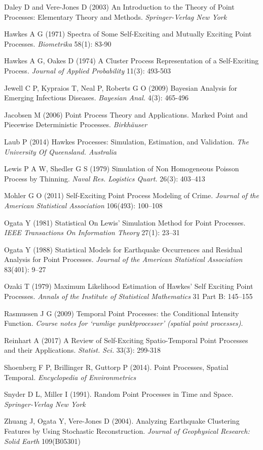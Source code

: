 \documentclass[11pt,a4paper]{article}
\begin{document}
\begin{thebibliography}{99}

 Daley D and Vere-Jones D (2003) An Introduction to the Theory of Point Processes: Elementary Theory and Methods. \textit{Springer-Verlag New York}

 Hawkes A G (1971) Spectra of Some Self-Exciting and Mutually Exciting Point Processes. \textit{Biometrika} 58(1): 83-90

 Hawkes A G, Oakes D (1974) A Cluster Process Representation of a Self-Exciting Process. \textit{Journal of Applied Probability} 11(3): 493-503

 Jewell C P, Kypraios T, Neal P, Roberts G O (2009) Bayesian Analysis for Emerging Infectious Diseases. \textit{Bayesian Anal.} 4(3): 465-496

 Jacobsen M (2006) Point Process Theory and Applications. Marked Point and Piecewise Deterministic Processes. \textit{Birkh\"{a}user}

 Laub P (2014) Hawkes Processes: Simulation, Estimation, and Validation. \textit{The University Of Queensland. Australia}

 Lewis P A W, Shedler G S (1979) Simulation of Non Homogeneous Poisson Process by Thinning. \textit{Naval Res. Logistics Quart.} 26(3): 403–413

 Mohler G O (2011) Self-Exciting Point Process Modeling of Crime. \textit{Journal of the American Statistical Association} 106(493): 100–108

 Ogata Y (1981) Statistical On Lewis' Simulation Method for Point Processes. \textit{IEEE Transactions On Information Theory} 27(1): 23–31

 Ogata Y (1988) Statistical Models for Earthquake Occurrences and Residual Analysis for Point Processes. \textit{Journal of the American Statistical Association} 83(401): 9–27

 Ozaki T (1979) Maximum Likelihood Estimation of Hawkes' Self Exciting Point Processes. \textit{Annals of the Institute of Statistical Mathematics} 31 Part B: 145–155

 Rasmussen J G (2009) Temporal Point Processes: the Conditional Intensity Function. \textit{Course notes for ‘rumlige punktprocesser’ (spatial point processes)}.

 Reinhart A (2017) A Review of Self-Exciting Spatio-Temporal Point Processes and their Applications. \textit{Statist. Sci.} 33(3): 299-318

 Shoenberg F P, Brillinger R, Guttorp P (2014). Point Processes, Spatial Temporal. \textit{Encyclopedia of Environmetrics}

 Snyder D L, Miller I (1991). Random Point Processes in Time and Space. \textit{Springer-Verlag New York}

 Zhuang J, Ogata Y, Vere-Jones D (2004). Analyzing Earthquake Clustering Features by Using Stochastic Reconstruction. \textit{Journal of Geophysical Research: Solid Earth} 109(B05301)

\end{thebibliography}
\end{document}
